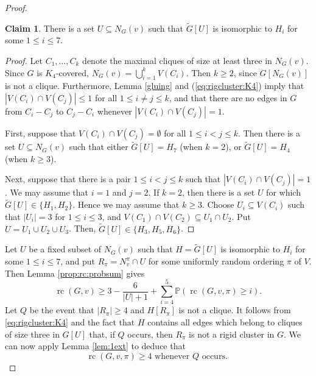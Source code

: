 \documentclass[11pt,a4paper]{article}
\theoremstyle{definition}
\newtheorem{claim}[theorem]{Claim}
\DeclareMathOperator{\rc}{rc}
\newcommand{\Prob}{\mathbb{P}}
\begin{document}
\begin{proof}
    \begin{claim}\label{claim:gamma}
        There is a set $U\subseteq N_G(v)$ such that 
        $\tilde G[U]$ is isomorphic to ${{H}}_i$ for some $1\leq i\leq 7$.
    \end{claim}
    
    \begin{proof}
        Let $C_1, \dots, C_k$ denote the maximal cliques 
        of size at least three in $N_G(v)$. Since $G$ is $K_4$-covered, $N_G(v)=\bigcup_{i=1}^k V(C_i)$.
         Then $k\geq 2$, since $G[N_G(v)]$ is not a clique.
        Furthermore, Lemma \ref{gluing} and (\ref{eq:rigcluster:K4}) imply that 
        $|V(C_i)\cap V(C_j)|\leq 1$ for all $1\leq i\not= j\leq k$, and that there are no edges in $G$ from $C_i-C_j$
        to $C_j-C_i$ whenever $|V(C_i)\cap V(C_j)|=1$. 
        
        First, suppose that $V(C_i)\cap V(C_j)=\emptyset$ for all $1\leq i<j\leq k$. Then there is a set $U\subseteq N_G(v)$ such that either $\tilde G[U]={{H}}_7$ (when $k=2$), or $\tilde G[U]={{H}}_4$ (when $k\geq 3$).
        
        Next, suppose that there is a pair $1\leq i<j \leq k$ such that $|V(C_i)\cap V(C_j)|=1$. We may assume that $i=1$ and $j=2$. If $k=2$, then there is a set $U$ for which
        $\tilde G[U]\in \{{{H}}_1,{{H}}_2\}$.
        Hence we may assume that $k\geq 3$. Choose $U_i\subseteq V(C_i)$ such that $|U_i|=3$ for $1\leq i\leq 3$, and $V(C_1)\cap V(C_2)\subseteq U_1\cap U_2$. Put $U=U_1\cup U_2\cup U_3$. Then, $\tilde G[U]\in \{{{H}}_3,{{H}}_5, {{H}}_6\}$.
    \end{proof}
    
    
    
    Let $U$ be a fixed subset of $N_G(v)$ such that $H=\tilde G[U]$ is isomorphic to ${{H}}_i$ for some $1\leq i\leq 7$, and  put $R_\pi= N_v^\pi \cap U$ for some uniformly random ordering $\pi$ of $V$. Then
    Lemma \ref{prop:rc:probsum} gives
\begin{equation}\label{eqnew:17}
\rc(G,v)\geq 3-\frac{6}{|U|+1}+\sum_{i=4}^5\Prob(\rc(G,v,\pi)\geq i).
\end{equation}
    Let $Q$ be the event that $|R_\pi|\geq 4$ and $H[R_\pi]$ is not a clique. It follows from
\eqref{eq:rigcluster:K4} and
the fact that $H$ contains all edges which belong to cliques of size three in $G[U]$ that, if $Q$ occurs, then $R_\pi$ is not a rigid cluster in $G$. 
We can now apply  Lemma \ref{lem:1ext}
to deduce that 
\begin{equation}\label{eq:nyolc}
\mbox{$\rc(G,v,\pi)\geq 4$ whenever $Q$ occurs. } 
\end{equation}
    

\end{proof}
\end{document}
